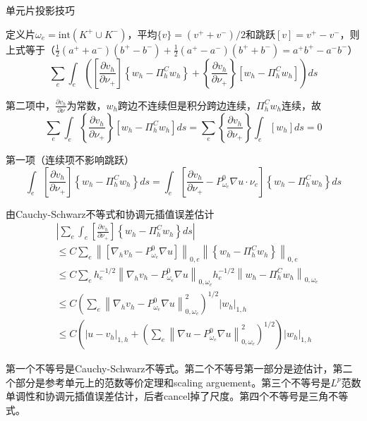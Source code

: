 单元片投影技巧

定义片$\omega_e = \text{int}(K^+ \cup K^-)$，平均$\{v\} = (v^+ + v^-)/2$和跳跃$[v] = v^+ - v^-$，则上式等于（$\frac{1}{2}(a^+ + a^-)(b^+ - b^-) + \frac{1}{2}(a^+ - a^-)(b^+ + b^-) = a^+ b^+ - a^- b^-$）
\[
  \sum_{e} \int_{e}\left(\left[\frac{\partial v_{h}}{\partial \nu_{+}}\right]\left\{w_{h}-\Pi_{h}^{C} w_{h}\right\}+\left\{\frac{\partial v_{h}}{\partial \nu_{+}}\right\}\left[w_{h}-\Pi_{h}^{C} w_{h}\right]\right) ds
\]

第二项中，$\frac{\partial v_{h}}{\partial \nu}$为常数，$w_{h}$跨边不连续但是积分跨边连续，$\Pi_{h}^{C} w_{h}$连续，故
\[
  \sum_{e} \int_e \left\{\frac{\partial v_{h}}{\partial \nu_{+}}\right\}\left[w_{h}-\Pi_{h}^{C} w_{h}\right] ds = \sum_{e} \left\{\frac{\partial v_{h}}{\partial \nu_{+}}\right\} \int_e \left[w_{h}\right] ds = 0
\]

第一项（连续项不影响跳跃）
\[
  \int_{e}\left[\frac{\partial v_{h}}{\partial \nu_{+}}\right]\left\{w_{h}-\Pi_{h}^{C} w_{h}\right\} ds=\int_{e}\left[\frac{\partial v_{h}}{\partial \nu_{+}}-P_{\omega_{e}}^{0} \nabla u \cdot \nu_{e}\right]\left\{w_{h}-\Pi_{h}^{C} w_{h}\right\} ds
\]

由Cauchy-Schwarz不等式和协调元插值误差估计
\[
  \begin{aligned}
    &\left|\sum_{e} \int_{e}\left[\frac{\partial v_{h}}{\partial \nu_{+}}\right]\left\{w_{h}-\Pi_{h}^{C} w_{h}\right\} ds\right| \\
    &\le C \sum_{e} \left\|\left[\nabla_{h} v_{h}-P_{\omega_{e}}^{0} \nabla u\right]\right\|_{0, e} \left\|\left\{w_{h}-\Pi_{h}^{C} w_{h}\right\}\right\|_{0, e} \\
    &\le C \sum_{e} h_{e}^{-1 / 2}\left\|\nabla_{h} v_{h}-P_{\omega_{e}}^{0} \nabla u\right\|_{0, \omega_{e}} h_{e}^{-1 / 2}\left\|w_{h}-\Pi_{h}^{C} w_{h}\right\|_{0, \omega_{e}} \\
    &\le C\left(\sum_{e}\left\|\nabla_{h} v_{h}-P_{\omega_{e}}^{0} \nabla u\right\|_{0, \omega_{e}}^{2}\right)^{1 / 2}\left|w_{h}\right|_{1, h} \\
    &\le C\left(\left|u-v_{h}\right|_{1, h}+\left(\sum_{e}\left\|\nabla u-P_{\omega_{e}}^{0} \nabla u\right\|_{0, \omega_{e}}^{2}\right)^{1 / 2}\right)\left|w_{h}\right|_{1, h}
  \end{aligned}
\]

第一个不等号是Cauchy-Schwarz不等式。第二个不等号第一部分是迹估计，第二个部分是参考单元上的范数等价定理和scaling arguement。第三个不等号是$L^p$范数单调性和协调元插值误差估计，后者cancel掉了尺度。第四个不等号是三角不等式。

